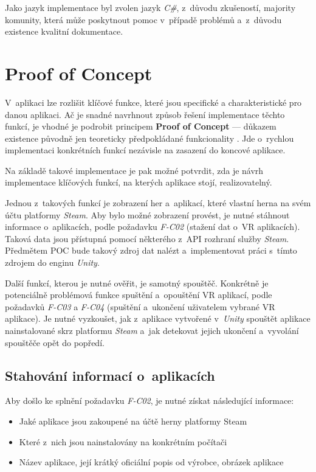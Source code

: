 Jako jazyk implementace byl zvolen jazyk \emph{C\#}, z~důvodu zkušeností, majority komunity, která může poskytnout pomoc
v~případě problémů a~z~důvodu existence kvalitní dokumentace.

\section{Proof of Concept}\label{proof-of-concept}

V~aplikaci lze rozlišit klíčové funkce, které jsou specifické a
charakteristické pro danou aplikaci. Ač je snadné navrhnout způsob
řešení implementace těchto funkcí, je vhodné je podrobit
principem \textbf{Proof of Concept} --- důkazem existence původně jen
teoreticky předpokládané funkcionality \autocite{proofofconcept}. Jde o~rychlou implementaci
konkrétních funkcí nezávisle na zasazení do koncové aplikace.

Na základě takové implementace je pak možné potvrdit, zda je návrh
implementace klíčových funkcí, na kterých aplikace stojí,
realizovatelný.

Jednou z~takových funkcí je zobrazení her a~aplikací, které vlastní herna na svém
účtu platformy \emph{Steam}. Aby bylo možné zobrazení provést, je nutné
stáhnout informace o~aplikacích, podle požadavku \emph{F-C02} (stažení dat
o~VR aplikacích). Taková data jsou přístupná pomocí některého z~API
rozhraní služby \emph{Steam}. Předmětem POC bude takový zdroj dat nalézt
a~implementovat práci s~tímto zdrojem do enginu \emph{Unity}.

Další funkcí, kterou je nutné ověřit, je samotný spouštěč. Konkrétně
je potenciálně problémová funkce spuštění a~opouštění VR aplikací, podle
požadavků \emph{F-C03} a \emph{F-C04} (spuštění a~ukončení uživatelem
vybrané VR aplikace). Je nutné vyzkoušet, jak z~aplikace vytvořené
v~\emph{Unity} spouštět aplikace nainstalované skrz platformu \emph{Steam}
a~jak detekovat jejich ukončení a~vyvolání spouštěče opět do popředí.

\subsection{Stahování informací
o~aplikacích}\label{stahovuxe1nuxed-informacuxed-o-aplikacuxedch}

Aby došlo ke splnění požadavku \emph{F-C02}, je nutné získat následující
informace:

\begin{itemize}
\tightlist
\item
  Jaké aplikace jsou zakoupené na účtě herny platformy Steam
\item
  Které z~nich jsou nainstalovány na konkrétním počítači
\item
  Název aplikace, její krátký oficiální popis od výrobce, obrázek
  aplikace
\end{itemize}

